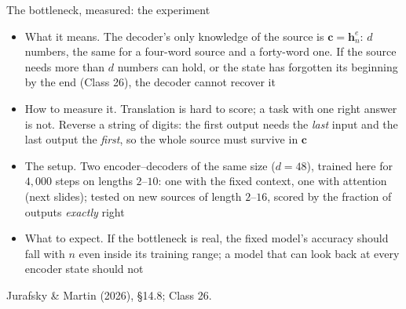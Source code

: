 \documentclass[aspectratio=169, 11pt]{beamer}
\newcommand{\srcline}[1]{%
  \par\vspace{0.25em}%
  {\scriptsize\color{mcMuted}\hfill #1\par}}
\begin{document}
\begin{frame}{The bottleneck, measured: the experiment}
  \vspace{-0.3em}
  {\footnotesize
  \begin{itemize}\itemsep0.26em
    \item \alert{What it means.} The decoder's only knowledge of the source
          is $\mathbf{c} = \mathbf{h}^e_n$: $d$ numbers, the same for a
          four-word source and a forty-word one. If the source needs more
          than $d$ numbers can hold, or the state has forgotten its
          beginning by the end (Class 26), the decoder cannot recover it
    \item \alert{How to measure it.} Translation is hard to score; a task
          with one right answer is not. \alert{Reverse a string of digits}:
          the first output needs the \emph{last} input and the last output
          the \emph{first}, so the whole source must survive in $\mathbf{c}$
    \item \alert{The setup.} Two encoder--decoders of the same size
          ($d = 48$), trained here for $4{,}000$ steps on lengths $2$--$10$:
          one with the fixed context, one with attention (next slides);
          tested on new sources of length $2$--$16$, scored by the fraction
          of outputs \emph{exactly} right
    \item \alert{What to expect.} If the bottleneck is real, the fixed
          model's accuracy should fall with $n$ even inside its training
          range; a model that can look back at every encoder state should not
  \end{itemize}}
  \srcline{Jurafsky \& Martin (2026), \S14.8; Class 26.}
\end{frame}
\end{document}
